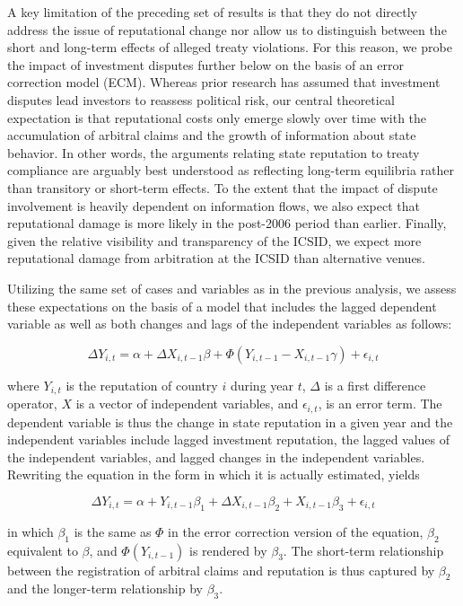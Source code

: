 \documentclass[12pt,onesided]{amsart}
\begin{document}
A key limitation of the preceding set of results is that they do not directly address the issue of reputational change nor allow us to distinguish between the short and long-term effects of alleged treaty violations. For this reason, we probe the impact of investment disputes further below on the basis of an error correction model (ECM). Whereas prior research has assumed that investment disputes lead investors to reassess political risk, our central theoretical expectation is that reputational costs only emerge slowly over time with the accumulation of arbitral claims and the growth of information about state behavior. In other words, the arguments relating state reputation to treaty compliance are arguably best understood as reflecting long-term equilibria rather than transitory or short-term effects. To the extent that the impact of dispute involvement is heavily dependent on information flows, we also expect that reputational damage is more likely in the post-2006 period than earlier. Finally, given the relative visibility and transparency of the ICSID, we expect more reputational damage from arbitration at the ICSID than alternative venues.

Utilizing the same set of cases and variables as in the previous analysis, we assess these expectations on the basis of a model that includes the lagged dependent variable as well as both changes and lags of the independent variables as follows:

\begin{equation}
\Delta Y_{i,t} = \alpha + \Delta X_{i,t-1} \beta + \Phi(Y_{i,t-1} - X_{i,t-1} \gamma) + \epsilon_{i,t}
\end{equation}

where $Y_{i,t}$ is the reputation of country $i$ during year $t$, $\Delta$ is a first difference operator, $X$ is a vector of independent variables, and $\epsilon_{i,t}$, is an error term. The dependent variable is thus the change in state reputation in a given year and the independent variables include lagged investment reputation, the lagged values of the independent variables, and lagged changes in the independent variables. Rewriting the equation in the form in which it is actually estimated, yields

\begin{equation}
\Delta Y_{i,t} = \alpha + Y_{i,t-1} \beta_{1} + \Delta X_{i,t-1} \beta_{2} + X_{i, t-1} \beta_{3} + \epsilon_{i,t}
\end{equation}

in which $\beta_{1}$ is the same as $\Phi$ in the error correction version of the equation, $\beta_{2}$ equivalent to $\beta$, and $\Phi(Y_{i,t-1})$ is rendered by $\beta_{3}$. The short-term relationship between the registration of arbitral claims and reputation is thus captured by $\beta_{2}$  and the longer-term relationship by $\beta_{3}$.
\end{document}
